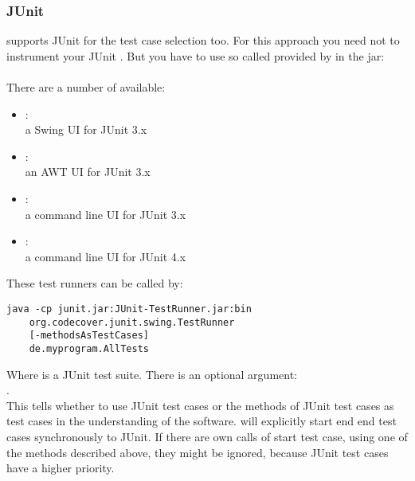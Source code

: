 \subsubsection{JUnit}
\codecover supports JUnit for the test case selection too. For this approach you need not to instrument your JUnit . But you have to use so called  provided by \codecover in the jar: \\
 \\
There are a number of  available:
\begin{itemize}
  \item {}: \\
a Swing UI for JUnit 3.x
  \item {}: \\
an AWT UI for JUnit 3.x
  \item {}: \\
a command line UI for JUnit 3.x
  \item {}: \\
a command line UI for JUnit 4.x
\end{itemize}
These test runners can be called by:
\begin{verbatim}
java -cp junit.jar:JUnit-TestRunner.jar:bin
    org.codecover.junit.swing.TestRunner
    [-methodsAsTestCases]
    de.myprogram.AllTests
\end{verbatim}
Where  is a JUnit test suite. There is an optional argument: \\ . \\
This tells \codecover whether to use JUnit test cases or the methods of JUnit test cases as test cases in the understanding of the software. \codecover will explicitly start end end test cases synchronously to JUnit. If there are own calls of start test case, using one of the methods described above, they might be ignored, because JUnit test cases have a higher priority.

